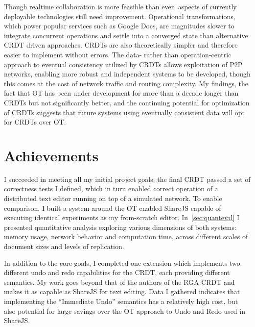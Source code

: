 \documentclass[12pt,a4paper,twoside,openright]{report}
\begin{document}
Though realtime collaboration is more feasible than ever, aspects of currently deployable technologies still need improvement. Operational transformations, which power popular services such as Google Docs, are magnitudes slower to integrate concurrent operations and settle into a converged state than alternative CRDT driven approaches. CRDTs are also theoretically simpler and therefore easier to implement without errors. The data- rather than operation-centric approach to eventual consistency utilized by CRDTs allows exploitation of P2P networks, enabling more robust and independent systems to be developed, though this comes at the cost of network traffic and routing complexity. My findings, the fact that OT has been under development for more than a decade longer than CRDTs but not significantly better, and the continuing potential for optimization of CRDTs suggests that future systems using eventually consistent data will opt for CRDTs over OT.


\section{Achievements}

I succeeded in meeting all my initial project goals: the final CRDT passed a set of correctness tests I defined, which in turn enabled correct operation of a distributed text editor running on top of a simulated network. To enable comparison, I built a system around the OT enabled ShareJS capable of executing identical experiments as my from-scratch editor. In~\cref{sec:quanteval} I presented quantitative analysis exploring various dimensions of both systems: memory usage, network behavior and computation time, across different scales of document sizes and levels of replication. 

In addition to the core goals, I completed one extension which implements two different undo and redo capabilities for the CRDT, each providing different semantics. My work goes beyond that of the authors of the RGA CRDT and makes it as capable as ShareJS for text editing. Data I gathered indicates that implementing the ``Immediate Undo'' semantics has a relatively high cost, but also potential for large savings over the OT approach to Undo and Redo used in ShareJS.
\end{document}
